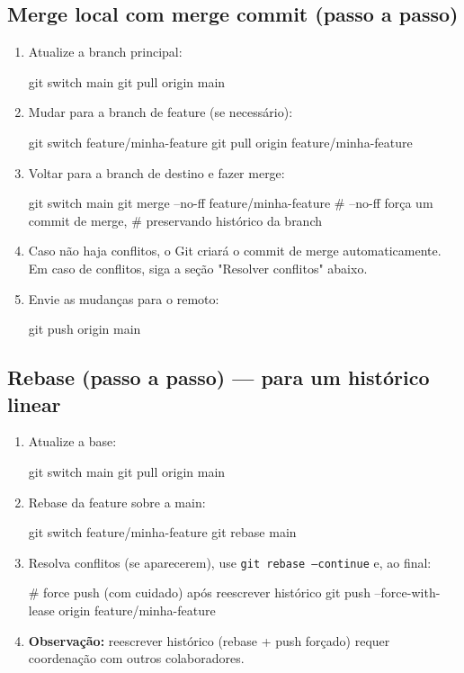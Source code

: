 \subsection{Merge local com merge commit (passo a passo)}
\begin{enumerate}
  \item Atualize a branch principal:
  \begin{bashcode}
  git switch main
  git pull origin main
  \end{bashcode}
  \item Mudar para a branch de feature (se necessário):
  \begin{bashcode}
  git switch feature/minha-feature
  git pull origin feature/minha-feature
  \end{bashcode}
  \item Voltar para a branch de destino e fazer merge:
  \begin{bashcode}
  git switch main
  git merge --no-ff feature/minha-feature
  # --no-ff força um commit de merge,
  # preservando histórico da branch
  \end{bashcode}
  \item Caso não haja conflitos, o Git criará o commit de merge automaticamente. Em caso de conflitos, siga a seção "Resolver conflitos" abaixo.
  \item Envie as mudanças para o remoto:
  \begin{bashcode}
  git push origin main
  \end{bashcode}
\end{enumerate}

\subsection{Rebase (passo a passo) — para um histórico linear}
\begin{enumerate}
  \item Atualize a base:
  \begin{bashcode}
  git switch main
  git pull origin main
  \end{bashcode}
  \item Rebase da feature sobre a main:
  \begin{bashcode}
  git switch feature/minha-feature
  git rebase main
  \end{bashcode}
  \item Resolva conflitos (se aparecerem), use \texttt{git rebase --continue} e, ao final:
  \begin{bashcode}
  # force push (com cuidado) após reescrever histórico
  git push --force-with-lease origin feature/minha-feature
  \end{bashcode}
  \item \textbf{Observação:} reescrever histórico (rebase + push forçado) requer coordenação com outros colaboradores.
\end{enumerate}

